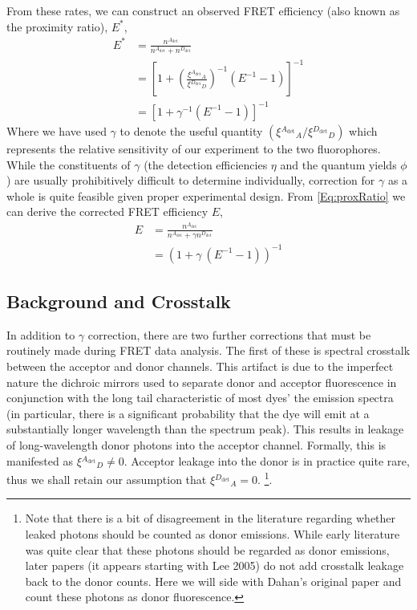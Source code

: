 \documentclass{article}
\newcommand{\dt}[1]{\ensuremath{^{#1_\mathrm{det}}}}   %
\begin{document}
From these rates, we can construct an observed FRET efficiency (also
known as the proximity ratio), $E^*$,
\begin{align*}
  E^* & = \frac{n\dt{A}}{n\dt{A} + n\dt{D}} \\
      & = \left[ 1 + \left(\frac{\xi\dt{A}_A}{\xi\dt{D}_D}\right)^{-1} (E^{-1} - 1) \right]^{-1} \\
      & = \left[ 1 + \gamma^{-1} (E^{-1} - 1) \right]^{-1} \label{Eq:proxRatio}
\end{align*}
Where we have used $\gamma$ to denote the useful quantity $(\xi\dt{A}_A / \xi\dt{D}_D)$
which represents the relative sensitivity of our experiment to the two
fluorophores. While the constituents of $\gamma$ (the detection
efficiencies $\eta$ and the quantum yields $\phi$) are usually
prohibitively difficult to determine individually, correction for
$\gamma$ as a whole is quite feasible given proper experimental
design. From \eqref{Eq:proxRatio} we can derive the corrected FRET
efficiency $E$,
\begin{align}
  E & = \frac{n\dt{A}}{n\dt{A} + \gamma n\dt{D}} \\
  & = \left( 1 + \gamma ~ (E^{-1} - 1) \right)^{-1} \label{Eq:gammaFretEff}
\end{align}

\subsection{Background and Crosstalk}
In addition to $\gamma$ correction, there are two further corrections that
must be routinely made during FRET data analysis. The first of these
is spectral crosstalk between the acceptor and donor channels. This
artifact is due to the imperfect nature the dichroic mirrors
used to separate donor and acceptor fluorescence in conjunction with
the long tail characteristic of most dyes' the emission spectra (in
particular, there is a significant probability that the dye will emit
at a substantially longer wavelength than the spectrum peak).  This
results in leakage of long-wavelength donor photons into the acceptor
channel. Formally, this is manifested as $\xi\dt{A}_D \ne 0$. Acceptor
leakage into the donor is in practice quite rare, thus we shall retain
our assumption that $\xi\dt{D}_A=0$.
\footnote{Note that there is a bit of disagreement in the
literature regarding whether leaked photons should be counted as donor
emissions. While early literature\cite{Dahan2005,Taylor2010} was quite
clear that these photons should be regarded as donor emissions, later
papers (it appears starting with Lee 2005\cite{Lee2005}) do not add
crosstalk leakage back to the donor counts. Here we will side with
Dahan's original paper and count these photons as donor
fluorescence.}.
\end{document}
